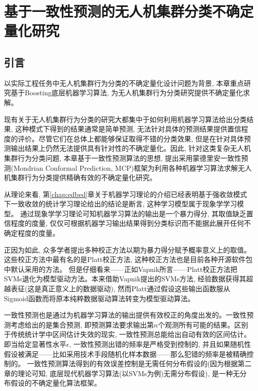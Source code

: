 \chapter{基于一致性预测的无人机集群分类不确定量化研究}
\label{chap:Swarm-MCP}

\section{引言}
以实际工程任务中无人机集群行为分类的不确定量化设计问题为背景, 本章重点研究基于Boosting底层机器学习算法, 为无人机集群行为分类研究提供不确定量化求解。

现有关于无人机集群行为分类的研究大都集中于如何利用机器学习算法给出分类结果, 这种模式下得到的结果通常是简单预测, 无法针对具体的预测结果提供置信程度的评价。尽管它们在总体上都能够保证取得不错的分类效果, 但是在针对具体预测输出结果上仍然无法提供具有针对性的不确定量化。因此, 针对这类复杂无人机集群行为分类问题, 本章基于一致性预测算法的思想, 提出采用蒙德里安一致性预测(Mondrian Conformal Prediction, MCP)框架为利用各种机器学习算法求解无人机集群行为分类提供精确有效的不确定量化研究。

从理论来看, 第\ref{chap:edbed}章关于机器学习理论的介绍已经表明基于强收敛模式下一致收敛的统计学习理论给出的结论是断言, 这种学习模型属于现象学学习模型\citep{vapnik2020,Husserl1937,wangdefeng-xianxiangxue-2005}。 通过现象学学习理论可知机器学习算法的输出是一个暴力得分\citep{vapniktalk2015}, 其取值缺乏置信程度的度量, 仅仅可根据机器学习输出结果得到分类标识而不能据此展开任何不确定程度的度量\citep{2006Hedging}。

正因为如此, 众多学者提出多种校正方法以期为暴力得分赋予概率意义上的取值。 这些校正方法中最有名的是Platt校正方法, 这种校正方法也是目前各种开源软件包中默认采用的方法\citep{Platt1999}。 但是仔细看来——正如Vapnik所言——Platt校正方法把SVMs退化为模型驱动方法\citep{Vapnik2021}。本来借助Vapnik提出的SVMs方法, 经验数据获得其超越表征(这是真正意义上的数据驱动), 然而Platt通过假设这些输出函数服从Sigmoid函数而将原本纯粹数据驱动算法转变为模型驱动算法\citep{Vapnik-Synergy-2016}。

一致性预测也是通过为机器学习算法的输出提供有效校正的角度出发的。一致性预测考虑给出的是集合预测, 即预测算法要求输出第$n$个观测所有可能的结果。区别于传统统计学中区间估计失效的现实\citep{Herbert1995,Herbert1998,Herbert2001,Ioannidis2005,Taylor2015,Tibshirani2015,Wasserstein2016,Altman2017,Andrade2019,Betensky2019,Lee2019,Ioannidis2019}, 一致性预测总能给出自动有效的区间估计。即当给定显著性水平$\epsilon$, 一致性预测出错的频率是严格受到控制的, 并且如果随机性假设被满足——比如采用技术手段随机化样本数据——那么犯错的频率是被精确控制的。 一致性预测算法得到的有效误差控制是无需任何分布假设的(因为根据第二章的理论可知, 底层现代机器学习算法(以SVMs为例)无需分布假设\citep{Cortes1995}), 是一种无分布假设的不确定量化算法框架。


